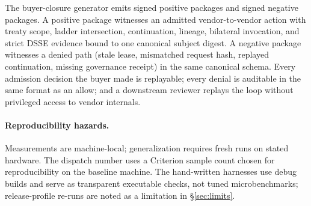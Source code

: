 The buyer-closure generator emits signed positive packages and signed negative packages. A positive package witnesses an admitted vendor-to-vendor action with treaty scope, ladder intersection, continuation, lineage, bilateral invocation, and strict DSSE evidence bound to one canonical subject digest. A negative package witnesses a denied path (stale lease, mismatched request hash, replayed continuation, missing governance receipt) in the same canonical schema. Every admission decision the buyer made is replayable; every denial is auditable in the same format as an allow; and a downstream reviewer replays the loop without privileged access to vendor internals.

\paragraph{Reproducibility hazards.}
Measurements are machine-local; generalization requires fresh runs on stated hardware. The dispatch number uses a Criterion sample count chosen for reproducibility on the baseline machine. The hand-written harnesses use debug builds and serve as transparent executable checks, not tuned microbenchmarks; release-profile re-runs are noted as a limitation in \S\ref{sec:limits}.
